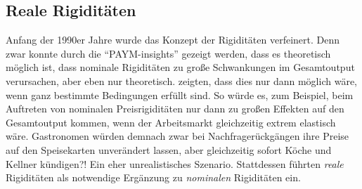 \subsection{Reale Rigiditäten}
\label{Reale Rigiditäten}

Anfang der 1990er Jahre wurde das Konzept der Rigiditäten verfeinert. Denn zwar konnte durch die "`PAYM-insights"' gezeigt werden, dass es theoretisch möglich ist, dass nominale Rigiditäten zu große Schwankungen im Gesamtoutput verursachen, aber eben nur theoretisch. \textcite[S. 183]{RomerDavid1990} zeigten, dass dies nur dann möglich wäre, wenn ganz bestimmte Bedingungen erfüllt sind. So würde es, zum Beispiel, beim Auftreten von nominalen Preisrigiditäten nur dann zu großen Effekten auf den Gesamtoutput kommen, wenn der Arbeitsmarkt gleichzeitig extrem elastisch wäre. Gastronomen würden demnach zwar bei Nachfragerückgängen ihre Preise auf den Speisekarten unverändert lassen, aber gleichzeitig sofort Köche und Kellner kündigen?! Ein eher unrealistisches Szenario. Stattdessen führten \textcite{RomerDavid1990, Ball1988, Ball1989} \textit{reale} Rigiditäten als notwendige Ergänzung zu \textit{nominalen} Rigiditäten ein.

